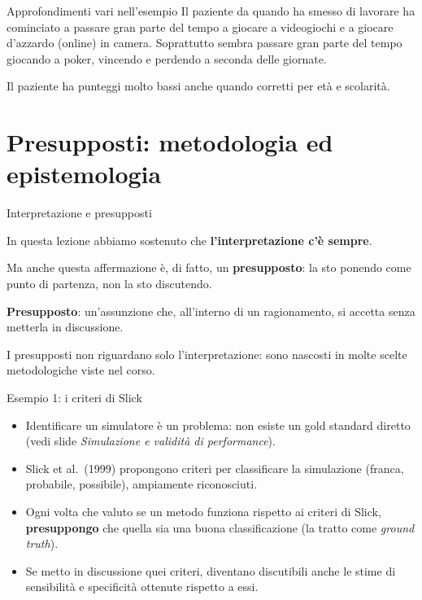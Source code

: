 \documentclass[
  ignorenonframetext,
  aspectratio=169,
]{beamer}
\providecommand{\tightlist}{%
  \setlength{\itemsep}{0pt}\setlength{\parskip}{0pt}}
\begin{document}
\begin{frame}{Approfondimenti vari nell'esempio}
\label{approfondimenti-vari-nellesempio}
Il paziente da quando ha smesso di lavorare ha cominciato a passare gran
parte del tempo a giocare a videogiochi e a giocare d'azzardo (online)
in camera. Soprattutto sembra passare gran parte del tempo giocando a
poker, vincendo e perdendo a seconda delle giornate.

Il paziente ha punteggi molto bassi anche quando corretti per età e
scolarità.
\end{frame}

\section{Presupposti: metodologia ed
epistemologia}\label{presupposti-metodologia-ed-epistemologia}

\begin{frame}{Interpretazione e presupposti}
\label{interpretazione-e-presupposti}
\small

In questa lezione abbiamo sostenuto che \textbf{l'interpretazione c'è
sempre}.

Ma anche questa affermazione è, di fatto, un \textbf{presupposto}: la
sto ponendo come punto di partenza, non la sto discutendo.

\pause

\textbf{Presupposto}: un'assunzione che, all'interno di un ragionamento,
si accetta senza metterla in discussione.

I presupposti non riguardano solo l'interpretazione: sono nascosti in
molte scelte metodologiche viste nel corso.
\end{frame}

\begin{frame}{Esempio 1: i criteri di Slick}
\label{esempio-1-i-criteri-di-slick}
\small

\begin{itemize}
\tightlist
\item
  Identificare un simulatore è un problema: non esiste un gold standard
  diretto (vedi slide \emph{Simulazione e validità di performance}).
\item
  Slick et al.~(1999) propongono criteri per classificare la simulazione
  (franca, probabile, possibile), ampiamente riconosciuti.
\item
  Ogni volta che valuto se un metodo funziona rispetto ai criteri di
  Slick, \textbf{presuppongo} che quella sia una buona classificazione
  (la tratto come \emph{ground truth}). \pause
\item
  Se metto in discussione quei criteri, diventano discutibili anche le
  stime di sensibilità e specificità ottenute rispetto a essi.
\end{itemize}
\end{frame}
\end{document}
